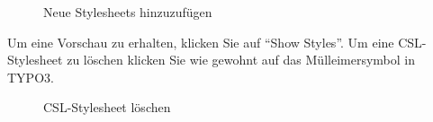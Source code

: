 \begin{figure}[h!]
 \centering
 \caption{Neue Stylesheets hinzuzufügen}
 \label{figure555}
\end{figure}
Um eine Vorschau zu erhalten, klicken Sie auf \enquote{Show Styles}.\newline
Um eine CSL-Stylesheet zu löschen klicken Sie wie gewohnt auf das Mülleimersymbol in TYPO3. 
\begin{figure}[h!]
 \centering
 \caption{CSL-Stylesheet löschen}
 \label{figure666}
\end{figure}




